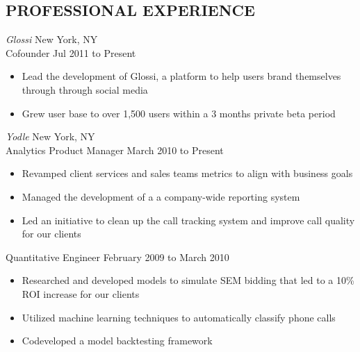 \documentclass{res}
\begin{document}
\thispagestyle{empty} %


\address{80 Park Avenue, Apt 3D\hspace{0.1in}\vline\hspace{0.1in}Hoboken, NJ 07030
\hspace{0.1in}\vline\hspace{0.1in}
dangoldin@gmail.com\hspace{0.1in}\vline\hspace{0.1in}(201) 341-3384}

\begin{resume}

\section{PROFESSIONAL EXPERIENCE}
\vspace{1pt}
{\sl Glossi} \hfill New York, NY \\
Cofounder \hfill   Jul 2011 to Present
   \begin{itemize} \itemsep -2pt %
   \item Lead the development of Glossi, a platform to help users brand themselves through through social media
   \item Grew user base to over 1,500 users within a 3 months private beta period
 \end{itemize} \vspace{-6pt}

{\sl Yodle} \hfill New York, NY \\
Analytics Product Manager \hfill   March 2010 to Present
   \begin{itemize} \itemsep -2pt %
   \item Revamped client services and sales teams metrics to align with business goals
   \item Managed the development of a a company-wide reporting system
   \item Led an initiative to clean up the call tracking system and improve call quality for our clients
 \end{itemize} \vspace{-12pt}
Quantitative Engineer \hfill   February 2009 to March 2010
   \begin{itemize} \itemsep -2pt %
   \item Researched and developed models to simulate SEM bidding that led to a 10\% ROI increase for our clients
   \item Utilized machine learning techniques to automatically classify phone calls
   \item Codeveloped a model backtesting framework
 \end{itemize} \vspace{-6pt}


\end{resume}
\end{document}
